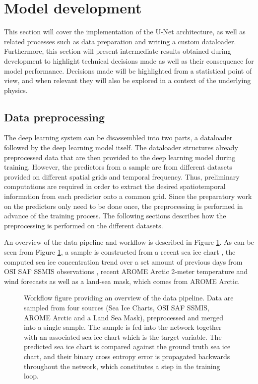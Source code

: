 \documentclass[../main/thesis]{subfiles}
\begin{document}
\section{Model development}
\label{sec:developing a unet}
This section will cover the implementation of the U-Net architecture, as well as related processes such as data preparation and writing a custom dataloader. Furthermore, this section will present intermediate results obtained during development to highlight technical decisions made as well as their consequence for model performance. Decisions made will be highlighted from a statistical point of view, and when relevant they will also be explored in a context of the underlying physics.

\subsection{Data preprocessing}
The deep learning system can be disassembled into two parts, a dataloader followed by the deep learning model itself. The dataloader structures already preprocessed data that are then provided to the deep learning model during training. However, the predictors from a sample are from different datasets provided on different spatial grids and temporal frequency. Thus, preliminary computations are required in order to extract the desired spatiotemporal information from each predictor onto a common grid. Since the preparatory work on the predictors only need to be done once, the preprocessing is performed in advance of the training process. The following sections describes how the preprocessing is performed on the different datasets.

An overview of the data pipeline and workflow is described in Figure \ref{fig:data_pipeline}. As can be seen from Figure \ref{fig:data_pipeline}, a sample is constructed from a recent sea ice chart \citep{Dinessen2020}, the computed sea ice concentration trend over a set amount of previous days from OSI SAF SSMIS observations \citep{Tonboe2017}, recent AROME Arctic \citep{Mueller2017} 2-meter temperature and wind forecasts as well as a land-sea mask, which comes from AROME Arctic. 

\begin{figure}
    \centering
    
    \caption{\label{fig:data_pipeline} Workflow figure providing an overview of the data pipeline. Data are sampled from four sources (Sea Ice Charts, OSI SAF SSMIS, AROME Arctic and a Land Sea Mask), preprocessed and merged into a single sample. The sample is fed into the network together with an associated sea ice chart which is the target variable. The predicted sea ice chart is compared against the ground truth sea ice chart, and their binary cross entropy error is propagated backwards throughout the network, which constitutes a step in the training loop.}
\end{figure}
\end{document}
